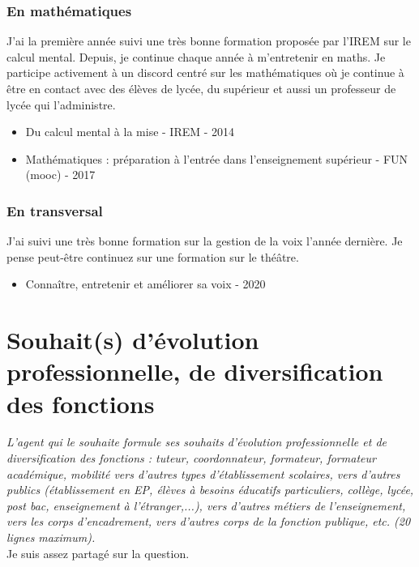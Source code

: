 \documentclass[11pt]{article}
\begin{document}
\subsubsection{En mathématiques}

J'ai la première année suivi une très bonne formation proposée par l'IREM sur le calcul mental. Depuis, je continue chaque année à m'entretenir en maths. Je participe activement à un discord centré sur les  mathématiques où je continue à être en contact avec des élèves de lycée, du supérieur et aussi un professeur de lycée qui l'administre. 

\begin{itemize}
  \item Du calcul mental à la mise - IREM - 2014
  \item Mathématiques : préparation à l'entrée dans l'enseignement supérieur - FUN (mooc) - 2017
\end{itemize}

\subsubsection{En transversal}

J'ai suivi une très bonne formation sur la gestion de la voix l'année dernière. Je pense peut-être continuez sur une formation sur le théâtre. 

\begin{itemize}
  \item Connaître, entretenir et améliorer sa voix - 2020
\end{itemize}

\newpage

\section{Souhait(s) d’évolution professionnelle, de diversification des fonctions}

\textit{L’agent qui le souhaite formule ses souhaits d’évolution professionnelle et de diversification des fonctions : tuteur, coordonnateur, formateur, formateur académique, mobilité vers d’autres types d’établissement scolaires, vers d’autres publics (établissement en EP, élèves à besoins éducatifs particuliers, collège, lycée, post bac, enseignement à l’étranger,...), vers d’autres métiers de l’enseignement, vers les corps d’encadrement, vers d’autres corps de la fonction publique, etc. (20 lignes maximum).}\\

Je suis assez partagé sur la question.\\
\end{document}
